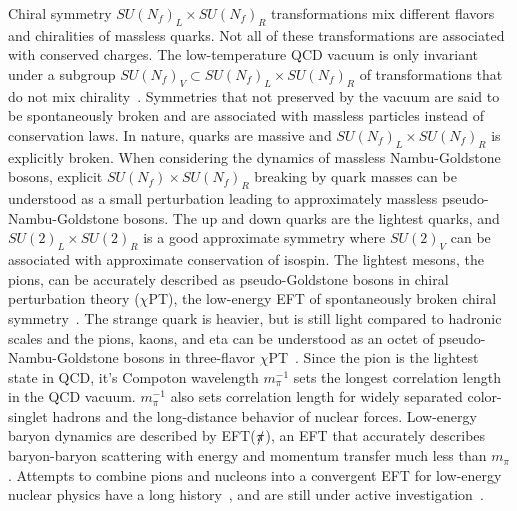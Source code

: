 Chiral symmetry $SU(N_f)_L\times SU(N_f)_R$ transformations mix different flavors and chiralities of massless quarks.
Not all of these transformations are associated with conserved charges.
The low-temperature QCD vacuum is only invariant under a subgroup $SU(N_f)_V \subset SU(N_f)_L\times SU(N_f)_R$ of transformations that do not mix chirality~\cite{Nambu:1961fr,Nambu:1961tp,Vafa:1983tf,Vafa:1984xg}.
Symmetries that not preserved by the vacuum are said to be spontaneously broken and are associated with massless particles instead of conservation laws.
In nature, quarks are massive and $SU(N_f)_L\times SU(N_f)_R$ is explicitly broken.
When considering the dynamics of massless Nambu-Goldstone bosons, explicit $SU(N_f)\times SU(N_f)_R$ breaking by quark masses can be understood as a small perturbation leading to approximately massless pseudo-Nambu-Goldstone bosons.
The up and down quarks are the lightest quarks, and $SU(2)_L\times SU(2)_R$ is a good approximate symmetry where $SU(2)_V$ can be associated with approximate conservation of isospin.
The lightest mesons, the pions, can be accurately described as pseudo-Goldstone bosons in chiral perturbation theory ($\chi$PT), the low-energy EFT of spontaneously broken chiral symmetry~\cite{Weinberg:1978kz,Gasser:1983yg,Gasser:1984gg}.
The strange quark is heavier, but is still light compared to hadronic scales and the pions, kaons, and eta can be understood as an octet of pseudo-Nambu-Goldstone bosons in three-flavor $\chi$PT~\cite{Gasser:1984gg}.
Since the pion is the lightest state in QCD, it's Compoton wavelength $m_\pi^{-1}$ sets the longest correlation length in the QCD vacuum.
$m_{\pi}^{-1}$ also sets correlation length for widely separated color-singlet hadrons and the long-distance behavior of nuclear forces.
Low-energy baryon dynamics are described by EFT($\slashed{\pi}$), an EFT that accurately describes baryon-baryon scattering with energy and momentum transfer much less than $m_\pi$.
Attempts to combine pions and nucleons into a convergent EFT for low-energy nuclear physics have a long history~\cite{Gasser:1987rb,Jenkins:1990jv,Weinberg:1990rz,Weinberg:1991um,Kaplan:1996xu,Kaplan:1998tg,Kaplan:1998we,Bedaque:1998kg,Fleming:1999ee,Beane:2001bc}, and are still under active investigation~\cite{Epelbaum:2008ga}.


